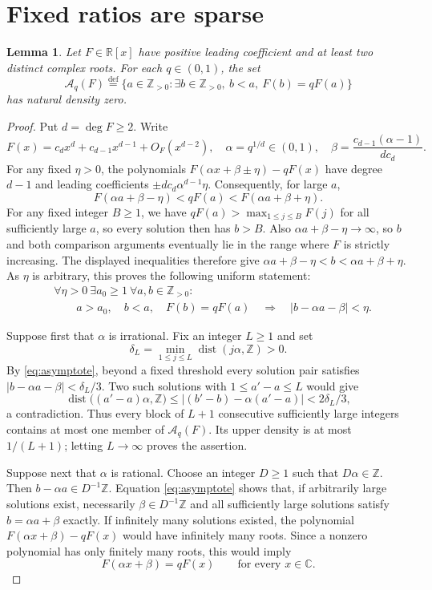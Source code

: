 \documentclass[10pt]{amsart}
\newtheorem{lemma}[theorem]{Lemma}
\theoremstyle{remark}
\newcommand{\Z}{\mathbb{Z}}
\newcommand{\C}{\mathbb{C}}
\newcommand{\R}{\mathbb{R}}
\newcommand{\defeq}{\stackrel{\mathrm{def}}{=}}
\begin{document}
\section{Fixed ratios are sparse}\label{sec:ratios}
\begin{lemma}\label{lem:sparse}
Let $F\in\R[x]$ have positive leading coefficient and at least two
distinct complex roots. For each $q\in(0,1)$, the set
\[
 \mathcal A_q(F)\defeq
 \{a\in\Z_{>0}:\exists b\in\Z_{>0},\ b<a,\ F(b)=qF(a)\}
\]
has natural density zero.
\end{lemma}
\begin{proof}
Put $d=\deg F\geq2$. Write
\[
 F(x)=c_d x^d+c_{d-1}x^{d-1}+O_F(x^{d-2}),\quad
 \alpha=q^{1/d}\in(0,1),\quad
 \beta=\frac{c_{d-1}(\alpha-1)}{dc_d}.
\]
For any fixed $\eta>0$, the polynomials $F(\alpha x+\beta\pm\eta)-qF(x)$ have degree $d-1$ and
leading coefficients $\pm dc_d\alpha^{d-1}\eta$. Consequently, for large $a$,
\[
 F(\alpha a+\beta-\eta)<qF(a)<F(\alpha a+\beta+\eta).
\]
For any fixed integer $B\geq1$, we have
$qF(a)>\max_{1\leq j\leq B}F(j)$ for all sufficiently large $a$,
so every solution then has $b>B$.
Also $\alpha a+\beta-\eta\to\infty$, so $b$ and both comparison
arguments eventually lie in the range where $F$ is strictly increasing.
The displayed inequalities therefore give
$\alpha a+\beta-\eta<b<\alpha a+\beta+\eta$.
As $\eta$ is arbitrary, this proves the following uniform statement:
\begin{equation}\label{eq:asymptote}
\begin{aligned}
 &\forall\eta>0\ \exists a_0\geq1\ \forall a,b\in\Z_{>0}:\\
 &\qquad a>a_0,\quad b<a,\quad F(b)=qF(a)
       \quad\Longrightarrow\quad |b-\alpha a-\beta|<\eta.
\end{aligned}
\end{equation}

Suppose first that $\alpha$ is irrational. Fix an integer $L\geq1$ and set
\[
 \delta_L=\min_{1\leq j\leq L}\operatorname{dist}(j\alpha,\Z)>0.
\]
By \eqref{eq:asymptote}, beyond a fixed threshold every solution pair
satisfies $|b-\alpha a-\beta|<\delta_L/3$. Two such solutions with
$1\leq a'-a\leq L$ would give
\[
 \operatorname{dist}\bigl((a'-a)\alpha,\Z\bigr)
 \leq |(b'-b)-\alpha(a'-a)|<2\delta_L/3,
\]
a contradiction. Thus every block of $L+1$ consecutive sufficiently
large integers contains at most one member of $\mathcal A_q(F)$.
Its upper density is at most $1/(L+1)$; letting $L\to\infty$ proves
the assertion.

Suppose next that $\alpha$ is rational. Choose an integer $D\geq1$
such that $D\alpha\in\Z$. Then $b-\alpha a\in D^{-1}\Z$.
Equation \eqref{eq:asymptote} shows that, if arbitrarily large solutions
exist, necessarily $\beta\in D^{-1}\Z$ and all sufficiently large
solutions satisfy $b=\alpha a+\beta$ exactly. If infinitely many
solutions existed, the polynomial \(F(\alpha x+\beta)-qF(x)\) would have infinitely many roots. Since a nonzero polynomial has only finitely many roots, this would imply
\[
                   F(\alpha x+\beta)=qF(x)\qquad\text{for every }x\in\C.
\]


\end{proof}
\end{document}
